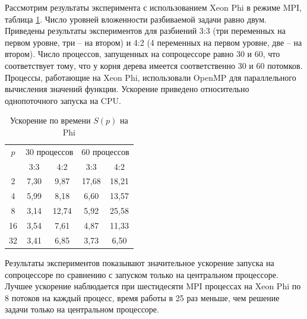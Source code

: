 \par
Рассмотрим результаты эксперимента с использованием Xeon Phi в режиме MPI, таблица \ref{table:time_speedUp_phi_2}. Число уровней вложенности разбиваемой задачи равно двум. Приведены результаты экспериментов для разбиений 3:3 (три переменных на первом уровне, три – на втором) и 4:2 (4 переменных на первом уровне, две – на втором). Число процессов, запущенных на сопроцессоре равно 30 и 60, что соответствует тому, что у корня дерева имеется соответственно 30 и 60 потомков. Процессы, работающие на Xeon Phi, использовали OpenMP для параллельного вычисления значений функции. Ускорение приведено относительно однопоточного запуска на CPU.
\begin{table}
    \centering
    \begin{tabular}{|c|c|c|c|c|}
    \hline
    \(p\) & \multicolumn{2}{|c|}{30 процессов} & \multicolumn{2}{|c|}{60 процессов}\\ \cline{2-5}
	& 3:3 & 4:2 & 3:3 & 4:2 \\ \hline
	2 & 7,30 & 9,87 & 17,68 & 18,21 \\ \hline
	4 & 5,99 & 8,18 & 6,60 & 13,57 \\ \hline
	8 & 3,14 & 12,74 & 5,92 & 25,58 \\ \hline
	16 & 3,54 & 7,61 & 4,87 & 11,33 \\ \hline
	32 & 3,41 & 6,85 & 3,73 & 6,50 \\ \hline
\end{tabular}
    \caption{Ускорение по времени \(S(p)\) на Phi}
    \label{table:time_speedUp_phi_2}
\end{table}
\par
Результаты экспериментов показывают значительное ускорение запуска на сопроцессоре по сравнению с запуском только на центральном процессоре. Лучшее ускорение наблюдается при шестидесяти MPI процессах на Xeon Phi по 8 потоков на каждый процесс, время работы в 25 раз меньше, чем решение задачи только на центральном процессоре.
